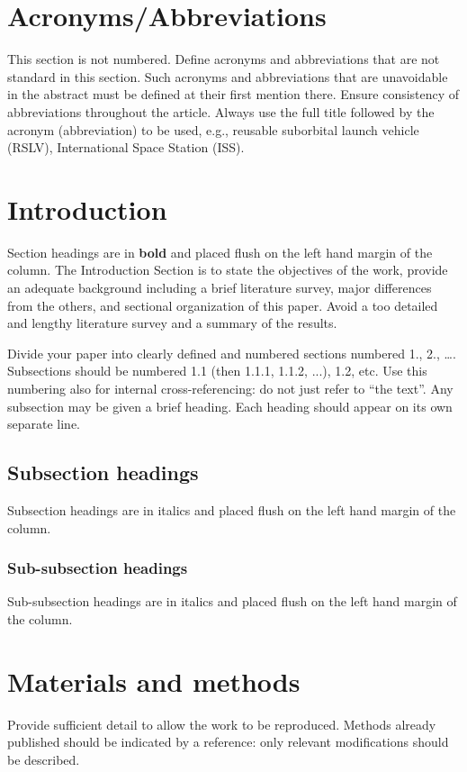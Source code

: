 \section*{Acronyms/Abbreviations}
This section is not numbered. Define acronyms and abbreviations that are not standard in this section. Such acronyms and abbreviations that are unavoidable in the abstract must be defined at their first mention there. Ensure consistency of abbreviations throughout the article. Always use the full title followed by the acronym (abbreviation) to be used, e.g., reusable suborbital launch vehicle (RSLV), International Space Station (ISS).

\section{Introduction}
Section headings are in \textbf{bold} and placed flush on the left hand margin of the column. The Introduction Section is to state the objectives of the work, provide an adequate background including a brief literature survey, major differences from the others, and sectional organization of this paper. Avoid a too detailed and lengthy literature survey and a summary of the results.

Divide your paper into clearly defined and numbered sections numbered 1., 2., …. Subsections should be numbered 1.1 (then 1.1.1, 1.1.2, ...), 1.2, etc. Use this numbering also for internal cross-referencing: do not just refer to “the text”. Any subsection may be given a brief heading. Each heading should appear on its own separate line.

\subsection{Subsection headings}
Subsection headings are in italics and placed flush on the left hand margin of the column.

\subsubsection{Sub-subsection headings}
Sub-subsection headings are in italics and placed flush on the left hand margin of the column.

\section{Materials and methods}
Provide sufficient detail to allow the work to be reproduced. Methods already published should be indicated by a reference: only relevant modifications should be described.

